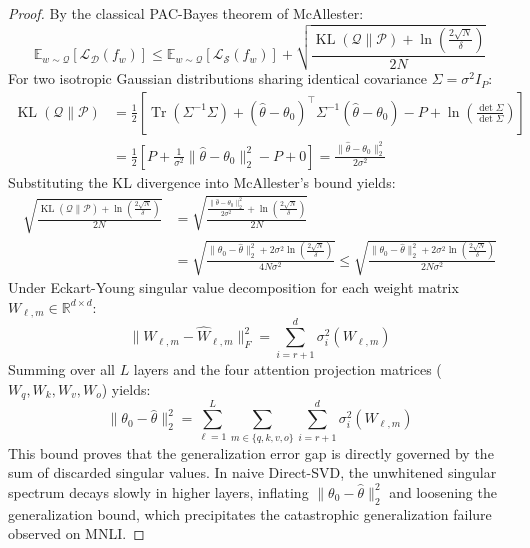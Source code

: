 \documentclass{article}
\begin{document}
\begin{proof}
By the classical PAC-Bayes theorem of McAllester:
\begin{equation}
    \mathbb{E}_{w \sim \mathcal{Q}} \left[ \mathcal{L}_{\mathcal{D}}(f_w) \right] \le \mathbb{E}_{w \sim \mathcal{Q}} \left[ \mathcal{L}_{\mathcal{S}}(f_w) \right] + \sqrt{\frac{\operatorname{KL}(\mathcal{Q} \parallel \mathcal{P}) + \ln\left(\frac{2\sqrt{N}}{\delta}\right)}{2 N}}
\end{equation}
For two isotropic Gaussian distributions sharing identical covariance $\Sigma = \sigma^2 I_P$:
\begin{align}
    \operatorname{KL}(\mathcal{Q} \parallel \mathcal{P}) &= \frac{1}{2} \left[ \operatorname{Tr}(\Sigma^{-1} \Sigma) + (\hat{\theta} - \theta_0)^\top \Sigma^{-1} (\hat{\theta} - \theta_0) - P + \ln\left(\frac{\det \Sigma}{\det \Sigma}\right) \right] \nonumber \\
    &= \frac{1}{2} \left[ P + \frac{1}{\sigma^2} \|\hat{\theta} - \theta_0\|_2^2 - P + 0 \right] = \frac{\|\hat{\theta} - \theta_0\|_2^2}{2 \sigma^2}
\end{align}
Substituting the KL divergence into McAllester's bound yields:
\begin{align}
    \sqrt{\frac{\operatorname{KL}(\mathcal{Q} \parallel \mathcal{P}) + \ln\left(\frac{2\sqrt{N}}{\delta}\right)}{2 N}} &= \sqrt{\frac{\frac{\|\hat{\theta} - \theta_0\|_2^2}{2 \sigma^2} + \ln\left(\frac{2\sqrt{N}}{\delta}\right)}{2 N}} \nonumber \\
    &= \sqrt{\frac{\|\theta_0 - \hat{\theta}\|_2^2 + 2 \sigma^2 \ln\left(\frac{2\sqrt{N}}{\delta}\right)}{4 N \sigma^2}} \le \sqrt{\frac{\|\theta_0 - \hat{\theta}\|_2^2 + 2 \sigma^2 \ln\left(\frac{2\sqrt{N}}{\delta}\right)}{2 N \sigma^2}}
\end{align}
Under Eckart-Young singular value decomposition for each weight matrix $W_{\ell, m} \in \mathbb{R}^{d \times d}$:
\begin{equation}
    \|W_{\ell, m} - \hat{W}_{\ell, m}\|_F^2 = \sum_{i=r+1}^d \sigma_i^2(W_{\ell, m})
\end{equation}
Summing over all $L$ layers and the four attention projection matrices ($W_q, W_k, W_v, W_o$) yields:
\begin{equation}
    \|\theta_0 - \hat{\theta}\|_2^2 = \sum_{\ell=1}^L \sum_{m \in \{q, k, v, o\}} \sum_{i=r+1}^d \sigma_i^2(W_{\ell, m})
\end{equation}
This bound proves that the generalization error gap is directly governed by the sum of discarded singular values. In naive Direct-SVD, the unwhitened singular spectrum decays slowly in higher layers, inflating $\|\theta_0 - \hat{\theta}\|_2^2$ and loosening the generalization bound, which precipitates the catastrophic generalization failure observed on MNLI.
\end{proof}
\end{document}
